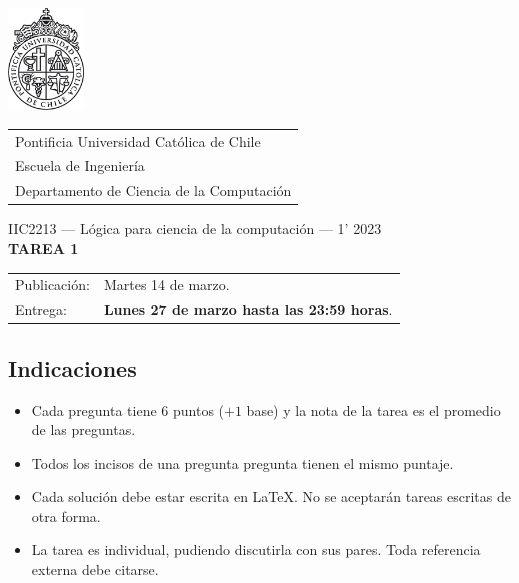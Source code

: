 \documentclass{article}
\begin{document}
\includegraphics[width=2cm]{uc.png}
\vspace*{-1.9cm}

\hspace*{2.1cm}
 \begin{tabular}{l}
  \sc Pontificia Universidad Católica de Chile \\
  \sc Escuela de Ingeniería \\
  \sc Departamento de Ciencia de la Computación
 \end{tabular}
 \bigskip

\vspace*{5mm}
\begin{center}
{IIC2213 --- Lógica para ciencia de la computación --- 1' 2023} \\
\vspace{3mm}
{\Large\bf TAREA 1} \\
\vspace{2mm}
\end{center}

\begin{tabular}{ll}
Publicación: & Martes 14 de marzo. \\
Entrega: & \textbf{Lunes 27 de marzo hasta las 23:59 horas}. \\
\end{tabular}

\subsection*{Indicaciones}

\begin{itemize}
\item Cada pregunta tiene 6 puntos ($+1$ base) y la nota de la tarea es el promedio de  las preguntas.
\item Todos los incisos de una pregunta pregunta tienen el mismo puntaje.
\item Cada solución debe estar escrita en \LaTeX. No se aceptarán tareas escritas de otra forma.
\item La tarea es individual, pudiendo discutirla con sus pares. Toda referencia externa debe citarse.
\end{itemize}
\end{document}
